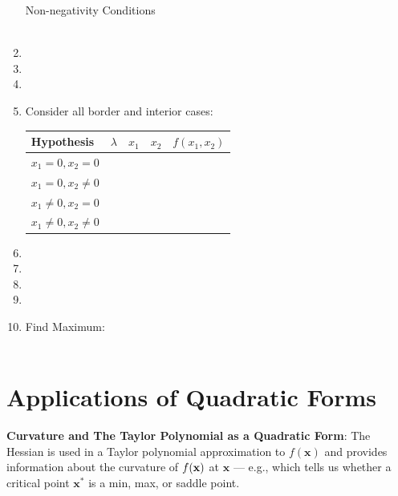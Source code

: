 \documentclass[]{book}
\theoremstyle{definition}
\theoremstyle{definition}
\theoremstyle{definition}
\theoremstyle{remark}
\begin{document}
\begin{enumerate}
Non-negativity Conditions\\
\phantom{$x_1  \geq  0$\\
$x_2  \geq  0$\\
$\lambda  \geq  $0}\\
\item[]
\item[]
\item[]

\item Consider all border and interior cases:
\begin{center}
\begin{tabular}{|l|ccc|c|}
\hline
Hypothesis  & $\lambda$& $x_1$ & $x_2$ & $f(x_1, x_2)$\\
\hline
$x_1 = 0, x_2 = 0$  &\multicolumn{3}{l|}{\phantom{No Solution}}& \\
$x_1 = 0, x_2 \neq 0$  &\multicolumn{3}{l|}{\phantom{No Solution}}& \\
$x_1 \neq 0, x_2 = 0$  & \multicolumn{3}{l|}{\phantom{No Solution}}& \\
$x_1 \neq 0, x_2 \neq 0$ &  & \phantom{$\frac{4}{3}$} & \phantom{$\frac{4}{3}$} & \phantom{$\log\frac{7}{3}$}\\
\hline
\end{tabular}
\end{center}

\item[]
\item[]
\item[]
\item[]

\item  Find Maximum:\\
\\
\end{enumerate}

\hypertarget{applications-of-quadratic-forms}{%
\section{Applications of Quadratic Forms}\label{applications-of-quadratic-forms}}

\textbf{Curvature and The Taylor Polynomial as a Quadratic Form}:
The Hessian is used in a Taylor polynomial approximation to \(f(\mathbf{x})\) and provides information about the curvature of \(f({\bf x})\) at \(\mathbf{x}\) --- e.g., which tells us whether a critical point \(\mathbf{x}^*\) is a min, max, or saddle point.
\end{document}
